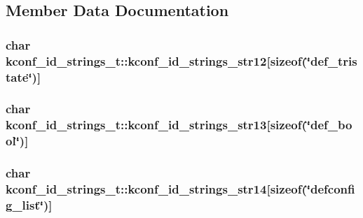 \subsection{Member Data Documentation}
\hypertarget{structkconf__id__strings__t_aebb5fad4eeb3e2b2c8283a4c6bf74e93}{
\subsubsection[{kconf\-\_\-id\-\_\-strings\-\_\-str12}]{\setlength{\rightskip}{0pt plus 5cm}char kconf\-\_\-id\-\_\-strings\-\_\-t\-::kconf\-\_\-id\-\_\-strings\-\_\-str12\mbox{[}sizeof(\char`\"{}def\-\_\-tristate\char`\"{})\mbox{]}}}\label{structkconf__id__strings__t_aebb5fad4eeb3e2b2c8283a4c6bf74e93}
\hypertarget{structkconf__id__strings__t_a265e81050faa77657481407ab37b1d66}{
\subsubsection[{kconf\-\_\-id\-\_\-strings\-\_\-str13}]{\setlength{\rightskip}{0pt plus 5cm}char kconf\-\_\-id\-\_\-strings\-\_\-t\-::kconf\-\_\-id\-\_\-strings\-\_\-str13\mbox{[}sizeof(\char`\"{}def\-\_\-bool\char`\"{})\mbox{]}}}\label{structkconf__id__strings__t_a265e81050faa77657481407ab37b1d66}
\hypertarget{structkconf__id__strings__t_ab366901ba295dcb57c7626f2e2ed7d45}{
\subsubsection[{kconf\-\_\-id\-\_\-strings\-\_\-str14}]{\setlength{\rightskip}{0pt plus 5cm}char kconf\-\_\-id\-\_\-strings\-\_\-t\-::kconf\-\_\-id\-\_\-strings\-\_\-str14\mbox{[}sizeof(\char`\"{}defconfig\-\_\-list\char`\"{})\mbox{]}}}\label{structkconf__id__strings__t_ab366901ba295dcb57c7626f2e2ed7d45}
